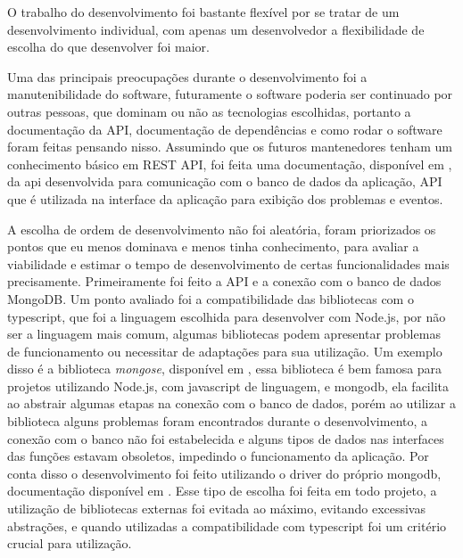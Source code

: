 O trabalho do desenvolvimento foi bastante flexível por se tratar de um desenvolvimento individual, 
com apenas um desenvolvedor a flexibilidade de escolha do que desenvolver foi maior.

Uma das principais preocupações durante o desenvolvimento foi a manutenibilidade do software, 
futuramente o software poderia ser continuado por outras pessoas, que dominam ou não as tecnologias 
escolhidas, portanto a documentação da API, documentação de dependências e como rodar o software 
foram feitas pensando nisso. Assumindo que os futuros mantenedores tenham um conhecimento básico em 
REST API, foi feita uma documentação, disponível em \cite{doc:gamajudge:api}, da api desenvolvida 
para comunicação com o banco de dados da aplicação, API que é utilizada na interface da aplicação 
para exibição dos problemas e eventos.

A escolha de ordem de desenvolvimento não foi aleatória, foram priorizados os pontos que eu menos 
dominava e menos tinha conhecimento, para avaliar a viabilidade e estimar o tempo de 
desenvolvimento de certas funcionalidades mais precisamente. Primeiramente foi feito a API e a 
conexão com o banco de dados MongoDB. Um ponto avaliado foi a compatibilidade das bibliotecas com o 
typescript, que foi a linguagem escolhida para desenvolver com Node.js, por não ser a linguagem 
mais comum, algumas bibliotecas podem apresentar problemas de funcionamento ou necessitar de 
adaptações para sua utilização. Um exemplo disso é a biblioteca \textit{mongose}, disponível em 
\cite{mongose}, essa biblioteca é bem famosa para projetos utilizando Node.js, com javascript de 
linguagem, e mongodb, ela facilita ao abstrair algumas etapas na conexão com o banco de dados, 
porém ao utilizar a biblioteca alguns problemas foram encontrados durante o desenvolvimento, a 
conexão com o banco não foi estabelecida e alguns tipos de dados nas interfaces das funções estavam 
obsoletos, impedindo o funcionamento da aplicação. Por conta disso o desenvolvimento foi feito 
utilizando o driver do próprio mongodb, documentação disponível em \cite{doc:mongodb:node}. Esse 
tipo de escolha foi feita em todo projeto, a utilização de bibliotecas externas foi evitada ao 
máximo, evitando excessivas abstrações, e quando utilizadas a compatibilidade com typescript foi um 
critério crucial para utilização.

